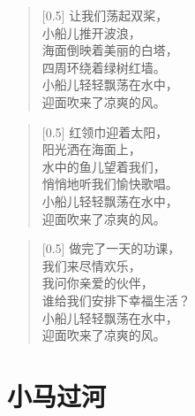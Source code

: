 \documentclass[12pt,UTF-8,openany]{ctexbook}
\begin{document}
\begin{Large}
    
    \begin{verse}[0.5\linewidth]
        让我们荡起双桨， \\
        小船儿推开波浪， \\
        海面倒映着美丽的白塔， \\
        四周环绕着绿树红墙。 \\
        小船儿轻轻飘荡在水中， \\
        迎面吹来了凉爽的风。
    \end{verse}
    
    
    \begin{verse}[0.5\linewidth]
        红领巾迎着太阳， \\
        阳光洒在海面上， \\
        水中的鱼儿望着我们， \\
        悄悄地听我们愉快歌唱。 \\
        小船儿轻轻飘荡在水中， \\
        迎面吹来了凉爽的风。
    \end{verse}
    
    
    \begin{verse}[0.5\linewidth]
        做完了一天的功课， \\
        我们来尽情欢乐， \\
        我问你亲爱的伙伴， \\
        谁给我们安排下幸福生活？ \\
        小船儿轻轻飘荡在水中， \\
        迎面吹来了凉爽的风。
    \end{verse}
    
\end{Large}

\chapter{小马过河}
\end{document}
